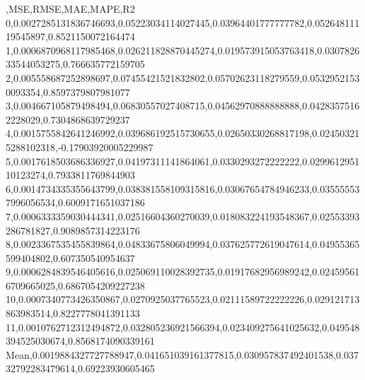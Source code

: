 ,MSE,RMSE,MAE,MAPE,R2
0,0.0027285131836746693,0.05223034114027445,0.03964401777777782,0.05264811119545897,0.8521150072164474
1,0.0006870968117985468,0.026211828870445274,0.019573915053763418,0.030782633544053275,0.766635772159705
2,0.005558687252898697,0.07455421521832802,0.05702623118279559,0.05329521530093354,0.8597379807981077
3,0.004667105879498494,0.06830557027408715,0.04562970888888888,0.04283575162228029,0.7304868639729237
4,0.0015755842641246992,0.039686192515730655,0.02650330268817198,0.024503215288102318,-0.17903920005229987
5,0.0017618503686336927,0.04197311141864061,0.0330293272222222,0.029961295110123274,0.7933811769844903
6,0.0014734335355643799,0.038381558109315816,0.03067654784946233,0.035555537996056534,0.6009171651037186
7,0.0006333359030444341,0.02516604360270039,0.018083224193548367,0.02553393286781827,0.9089857314223176
8,0.0023367535455839864,0.04833675806049994,0.037625772619047614,0.04955365599404802,0.607350540954637
9,0.0006284839546405616,0.025069110028392735,0.01917682956989242,0.024595616709665025,0.6867054209227238
10,0.0007340773426350867,0.0270925037765523,0.02111589722222226,0.029121713863983514,0.8227778041391133
11,0.0010762712312494872,0.032805236921566394,0.023409275641025632,0.049548394525030674,0.8568174090339161
Mean,0.0019884327727788947,0.041651039161377815,0.030957837492401538,0.03732792283479614,0.69223930605465
